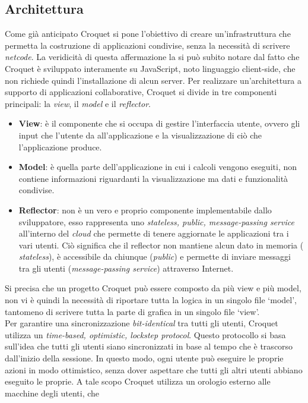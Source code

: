 \subsection{Architettura}\label{subsec:Croquet_architettura}
Come già anticipato Croquet si pone l'obiettivo di creare un'infrastruttura che permetta la costruzione di applicazioni condivise, senza la necessità di scrivere \textit{netcode}. La
veridicità di questa affermazione la si può subito notare dal fatto che Croquet è sviluppato interamente su JavaScript, noto linguaggio client-side, che non richiede quindi 
l'installazione di alcun server. Per realizzare un'architettura a supporto di applicazioni collaborative, Croquet si divide in tre componenti principali: 
la \textit{view}, il \textit{model} e il \textit{reflector}.
\begin{itemize}
    \item \textbf{View}: è il componente che si occupa di gestire l'interfaccia utente, ovvero gli input che l'utente da all'applicazione e la visualizzazione di ciò che
    l'applicazione produce. 
    \item \textbf{Model}: è quella parte dell'applicazione in cui i calcoli vengono eseguiti, non contiene informazioni riguardanti la visualizzazione ma dati e 
    funzionalità condivise.
    \item \textbf{Reflector}: non è un vero e proprio componente implementabile dallo sviluppatore, esso rappresenta uno \textit{stateless, public, message-passing service}
    all'interno del \textit{cloud} che permette di tenere aggiornate le applicazioni tra i vari utenti. Ciò significa che il reflector non mantiene alcun dato in memoria (\textit{
        stateless}), è accessibile da chiunque (\textit{public}) e permette di inviare messaggi tra gli utenti (\textit{message-passing service}) attraverso Internet.
\end{itemize}
Si precisa che un progetto Croquet può essere composto da più view e più model, non vi è quindi la necessità di riportare tutta la logica in un singolo file `model', tantomeno di
scrivere tutta la parte di grafica in un singolo file `view'.\\
Per garantire una sincronizzazione \textit{bit-identical} tra tutti gli utenti, Croquet utilizza un \textit{time-based, optimistic, lockstep protocol}. Questo protocollo si basa
sull'idea che tutti gli utenti siano sincronizzati in base al tempo che è trascorso dall'inizio della sessione. In questo modo, ogni utente può eseguire le proprie azioni in modo
ottimistico, senza dover aspettare che tutti gli altri utenti abbiano eseguito le proprie. A tale scopo Croquet utilizza un orologio esterno alle macchine degli utenti, che
